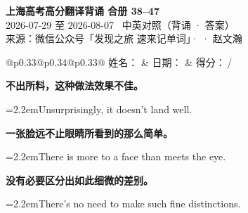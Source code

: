 \documentclass[11pt,a4paper]{article}
\newcommand{\num}[1]{\makebox[1.9em][r]{#1.}\hspace{0.3em}}
\begin{document}
\pagestyle{plain}
\begin{center}
{\LARGE\bfseries 上海高考高分翻译背诵 \quad 合册 38–47}\\[0.25em]
{\large 2026-07-29 至 2026-08-07 \quad\ 中英对照（背诵 · 答案）}\\[0.35em]
{\footnotesize 来源：微信公众号「发现之旅 速来记单词」·  · 赵文瀚}
\end{center}

\vspace{0.4em}
\noindent\begin{tabular}{@{}p{0.33\textwidth}@{}p{0.34\textwidth}@{}p{0.33\textwidth}@{}}
姓名：\underline{\hspace{2.0cm}} & 日期：\underline{\hspace{2.0cm}} & 得分：\underline{\hspace{1.4cm}}\,/ \\
\end{tabular}

\vspace{0.5em}

\vspace{0.8em}
\vspace{0.35em}\vspace{0.15em}

\begin{minipage}{\linewidth}

\num{1}\textbf{不出所料，这种做法效果不佳。}

\vspace{0.15em}

\noindent\hangindent=2.2em\hspace{2.2em}Unsurprisingly, it doesn't land well.

\end{minipage}

\begin{minipage}{\linewidth}

\num{2}\textbf{一张脸远不止眼睛所看到的那么简单。}

\vspace{0.15em}

\noindent\hangindent=2.2em\hspace{2.2em}There is more to a face than meets the eye.

\end{minipage}

\begin{minipage}{\linewidth}

\num{3}\textbf{没有必要区分出如此细微的差别。}

\vspace{0.15em}

\noindent\hangindent=2.2em\hspace{2.2em}There's no need to make such fine distinctions.

\end{minipage}
\end{document}
